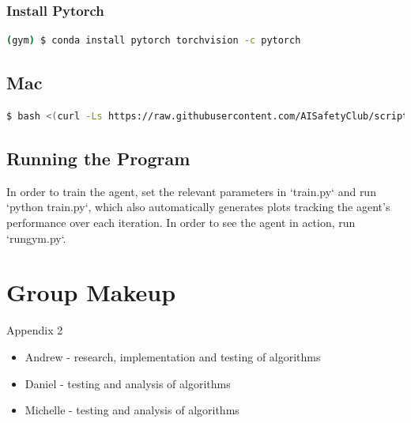 \documentclass[11pt]{article}
\begin{document}
 \subsubsection*{Install Pytorch}
 \begin{lstlisting}[language=bash]
    (gym) $ conda install pytorch torchvision -c pytorch
 \end{lstlisting}     
 \subsection*{Mac}
  \begin{lstlisting}[language=bash]
    $ bash <(curl -Ls https://raw.githubusercontent.com/AISafetyClub/scripts/master/gym_installer.sh)
  \end{lstlisting} 
  
\subsection*{Running the Program}
In order to train the agent, set the relevant parameters in `train.py` and run `python train.py`, which also automatically generates plots tracking the agent's performance over each iteration. In order to see the agent in action, run `rungym.py`.

\section{Group Makeup}

Appendix 2 
\begin{itemize}
    \item Andrew - research, implementation and testing of algorithms
    \item Daniel - testing and analysis of algorithms
    \item Michelle - testing and analysis of algorithms
\end{itemize}

 

\end{document}
